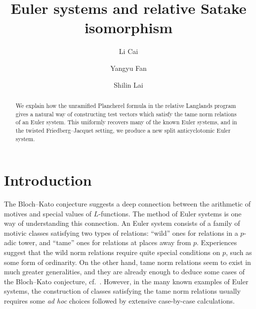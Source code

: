 \documentclass{amsart}
\theoremstyle{definition}
\theoremstyle{remark}
\newcommand{\1}{\mathbf{1}}
\theoremstyle{definition}
\begin{document}
\title{Euler systems and relative Satake isomorphism}
\author{Li Cai} 
\address[L.C.]{Academy for Multidisciplinary Studies, Beijing National Center for Applied Mathematics, Capital Normal University, Beijing, 100048, People's Republic of China
} 

\author{Yangyu Fan} 
\address[Y.F.]{Key Laboratory of Algebraic Lie Theory and Analysis of Ministry of Education, School of Mathematics and Statistics, Beijing Institute of Technology, Beijing, 100081, People's Republic of China
} 

\author{Shilin Lai} 
\address[S.L.]{Department of Mathematics, University of Michigan, 530 Church Street, Ann Arbor, MI 48109, USA} 


\begin{abstract}
  We explain how the unramified Plancherel formula in the relative Langlands program gives a natural way of constructing test vectors which satisfy the tame norm relations of an Euler system. This uniformly recovers many of the known Euler systems, and in the twisted Friedberg--Jacquet setting, we produce a new split anticyclotomic Euler system.
\end{abstract}

\maketitle
\setcounter{tocdepth}{1}
\tableofcontents

\section{Introduction}
The Bloch--Kato conjecture suggests a deep connection between the arithmetic of motives and special values of $L$-functions. The method of Euler systems is one way of understanding this connection. An Euler system consists of a family of motivic classes satisfying two types of relations: ``wild'' ones for relations in a $p$-adic tower, and ``tame'' ones for relations at places away from $p$. Experiences suggest that the wild norm relations require quite special conditions on $p$, such as some form of ordinarity. On the other hand, tame norm relations seem to exist in much greater generalities, and they are already enough to deduce some cases of the Bloch--Kato conjecture, cf.~\cite{JNS, LaiSkinner}. However, in the many known examples of Euler systems, the construction of classes satisfying the tame norm relations usually requires some \emph{ad hoc} choices followed by extensive case-by-case calculations.
\end{document}
